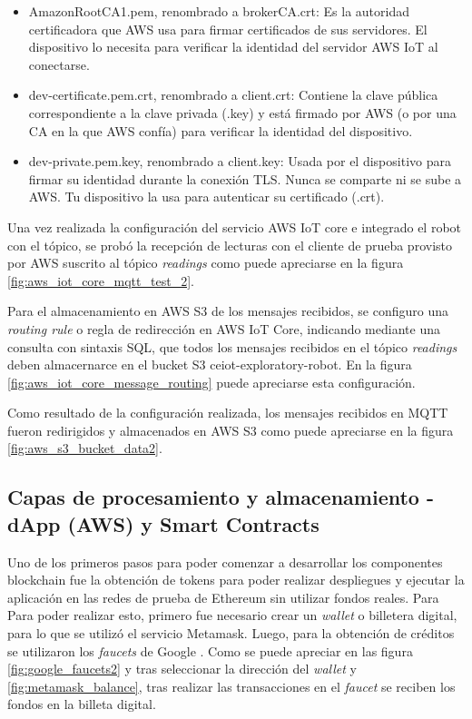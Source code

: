 \begin{itemize}
	\item AmazonRootCA1.pem, renombrado a brokerCA.crt:	Es la autoridad certificadora que AWS usa para firmar certificados de sus servidores. El dispositivo lo necesita para verificar la identidad del servidor AWS IoT al conectarse.
	\item dev-certificate.pem.crt, renombrado a client.crt: Contiene la clave pública correspondiente a la clave privada (.key) y está firmado por AWS (o por una CA en la que AWS confía) para verificar la identidad del dispositivo.
	\item dev-private.pem.key, renombrado a client.key: Usada por el dispositivo para firmar su identidad durante la conexión TLS. Nunca se comparte ni se sube a AWS. Tu dispositivo la usa para autenticar su certificado (.crt).
		
\end{itemize}

Una vez realizada la configuración del servicio AWS IoT core e integrado el robot con el tópico, se probó la recepción de lecturas con el cliente de prueba provisto por AWS suscrito al tópico \textit{readings} como puede apreciarse en la figura \ref{fig:aws_iot_core_mqtt_test_2}.


Para el almacenamiento en AWS S3 de los mensajes recibidos, se configuro una \textit{routing rule} o regla de redirección en AWS IoT Core, indicando mediante una consulta con sintaxis SQL, que todos los mensajes recibidos en el tópico \textit{readings} deben almacernarce en el bucket S3 ceiot-exploratory-robot. En la figura \ref{fig:aws_iot_core_message_routing} puede apreciarse esta configuración.
 


Como resultado de la configuración realizada, los mensajes recibidos en MQTT fueron redirigidos y almacenados en AWS S3 como puede apreciarse en la figura \ref{fig:aws_s3_bucket_data2}.



\subsection{Capas de procesamiento y almacenamiento - dApp (AWS) y Smart Contracts}

Uno de los primeros pasos para poder comenzar a desarrollar los componentes blockchain fue la obtención de tokens para poder realizar despliegues y ejecutar la aplicación en las redes de prueba de Ethereum sin utilizar fondos reales. Para Para poder realizar esto, primero fue necesario crear un \textit{wallet} o billetera digital, para lo que se utilizó el servicio Metamask. Luego, para la obtención de créditos se utilizaron los \textit{faucets} de Google \citep{google_faucets}. Como se puede apreciar en las figura \ref{fig:google_faucets2} y tras seleccionar la dirección del \textit{wallet} y \ref{fig:metamask_balance}, tras realizar las transacciones en el \textit{faucet} se reciben los fondos en la billeta digital. 



